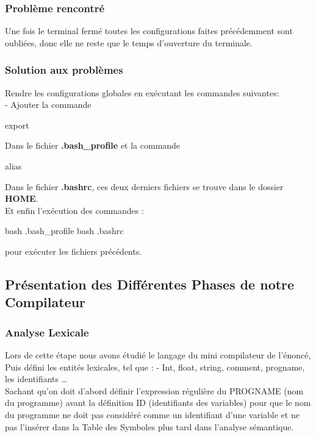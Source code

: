 \documentclass[12pt]{article}
\begin{document}
\subsubsection{Problème rencontré}
Une fois le terminal fermé toutes les configurations faites précédemment sont oubliées, donc elle ne reste que le temps d'ouverture du terminale.\\

\subsubsection{Solution aux problèmes}
Rendre les configurations globales en exécutant les commandes suivantes:\\
- Ajouter la commande 
\begin{sql} 
export 
\end{sql} 
Dans le fichier \textbf{.bash\_profile} et la commande 
\begin{sql}
alias
\end{sql}
Dans le fichier \textbf{.bashrc}, ces deux derniers fichiers se trouve dans le dossier \textbf{HOME}. \\

Et enfin l'exécution des commandes : 
\begin{sql} 
bash .bash\_profile 
bash .bashrc
\end{sql} 
pour exécuter les fichiers précédents.


 

\subsection{Présentation des Différentes Phases de notre Compilateur}
\subsubsection{Analyse Lexicale}
Lors de cette étape nous avons étudié le langage du mini compilateur de l'énoncé,\\
Puis défini les entités lexicales, tel que :
-	Int, float, string, comment, progname, les identifiants  …\\

Sachant qu'on doit d'abord définir l'expression régulière du PROGNAME (nom du programme) avant la définition ID (identifiants des variables)
pour que le nom du programme ne doit pas considéré comme un identifiant d'une variable et ne pas l'insérer dans la Table des Symboles plus tard dans l'analyse sémantique.\\
\end{document}
